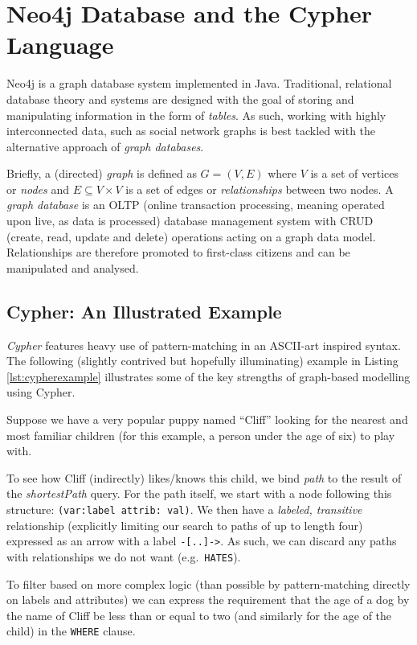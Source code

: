 \section{Neo4j Database and the Cypher Language}

Neo4j is a graph database system implemented in Java. Traditional, relational
database theory and systems are designed with the goal of storing and
manipulating information in the form of \emph{tables}. As such, working with
highly interconnected data, such as social network graphs is best tackled with
the alternative approach of \emph{graph databases}.

Briefly, a (directed) \emph{graph} is defined as $G = (V, E)$ where $V$ is a set
of vertices or \emph{nodes} and $E \subseteq V \times V$ is a set of edges or
\emph{relationships} between two nodes. A \emph{graph database} is an OLTP
(online transaction processing, meaning operated upon live, as data is
processed) database management system with CRUD (create, read, update and delete)
operations acting on a graph data model. Relationships are therefore promoted to
first-class citizens and can be manipulated and analysed.

\subsection*{Cypher: An Illustrated Example}

\emph{Cypher} features heavy use of pattern-matching in an ASCII-art inspired
syntax.  The following (slightly contrived but hopefully illuminating) example
in Listing \ref{lst:cypherexample} illustrates some of the key strengths of
graph-based modelling using Cypher. 

Suppose we have a very popular puppy named ``Cliff'' looking for the nearest
and most familiar children (for this example, a person under the age of six) to
play with.

To see how Cliff (indirectly) likes/knows this child, we bind \emph{path} to the
result of the \emph{shortestPath} query.  For the path itself, we start with a
node following this structure: \texttt{(var:label {attrib: val})}.
We then have a \emph{labeled, transitive} relationship (explicitly limiting our
search to paths of up to length four) expressed as an arrow with a label
\texttt{-[..]->}. As such, we can discard any paths with relationships we do not
want (e.g.\ \texttt{HATES}). 

To filter based on more complex logic (than possible by pattern-matching directly
on labels and attributes) we can express the requirement that the age of a dog by
the name of Cliff be less than or equal to two (and similarly for the age of the
child) in the \texttt{WHERE} clause.

